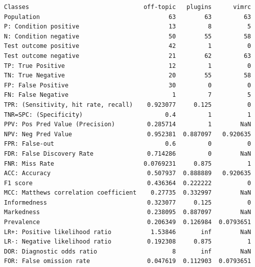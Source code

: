 \documentclass[12pt, a4paper]{article}
\begin{document}
\begin{verbatim}
Classes                                off-topic   plugins      vimrc  
Population                                    63        63         63  
P: Condition positive                         13         8          5  
N: Condition negative                         50        55         58  
Test outcome positive                         42         1          0  
Test outcome negative                         21        62         63  
TP: True Positive                             12         1          0  
TN: True Negative                             20        55         58  
FP: False Positive                            30         0          0  
FN: False Negative                             1         7          5  
TPR: (Sensitivity, hit rate, recall)    0.923077     0.125          0  
TNR=SPC: (Specificity)                       0.4         1          1  
PPV: Pos Pred Value (Precision)         0.285714         1        NaN  
NPV: Neg Pred Value                     0.952381  0.887097   0.920635  
FPR: False-out                               0.6         0          0  
FDR: False Discovery Rate               0.714286         0        NaN  
FNR: Miss Rate                         0.0769231     0.875          1  
ACC: Accuracy                           0.507937  0.888889   0.920635  
F1 score                                0.436364  0.222222          0  
MCC: Matthews correlation coefficient    0.27735  0.332997        NaN  
Informedness                            0.323077     0.125          0  
Markedness                              0.238095  0.887097        NaN  
Prevalence                              0.206349  0.126984  0.0793651  
LR+: Positive likelihood ratio           1.53846       inf        NaN  
LR-: Negative likelihood ratio          0.192308     0.875          1  
DOR: Diagnostic odds ratio                     8       inf        NaN  
FOR: False omission rate                0.047619  0.112903  0.0793651  
\end{verbatim}
\end{document}
